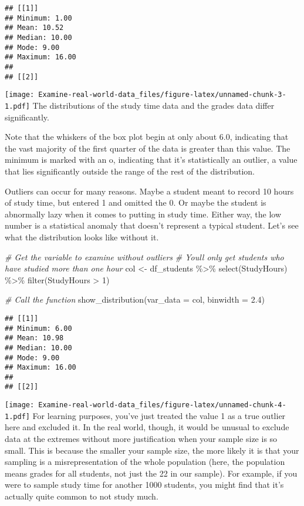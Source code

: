 \documentclass[
]{article}
\newenvironment{Shaded}{\begin{snugshade}}{\end{snugshade}}
\newcommand{\AttributeTok}[1]{\textcolor[rgb]{0.77,0.63,0.00}{#1}}
\newcommand{\CommentTok}[1]{\textcolor[rgb]{0.56,0.35,0.01}{\textit{#1}}}
\newcommand{\DecValTok}[1]{\textcolor[rgb]{0.00,0.00,0.81}{#1}}
\newcommand{\FloatTok}[1]{\textcolor[rgb]{0.00,0.00,0.81}{#1}}
\newcommand{\FunctionTok}[1]{\textcolor[rgb]{0.00,0.00,0.00}{#1}}
\newcommand{\NormalTok}[1]{#1}
\newcommand{\OtherTok}[1]{\textcolor[rgb]{0.56,0.35,0.01}{#1}}
\newcommand{\SpecialCharTok}[1]{\textcolor[rgb]{0.00,0.00,0.00}{#1}}
\begin{document}
\begin{verbatim}
## [[1]]
## Minimum: 1.00
## Mean: 10.52
## Median: 10.00
## Mode: 9.00
## Maximum: 16.00
## 
## [[2]]
\end{verbatim}

\texttt{[image: Examine-real-world-data\_files/figure-latex/unnamed-chunk-3-1.pdf]}
The distributions of the study time data and the grades data differ
significantly.

Note that the whiskers of the box plot begin at only about 6.0,
indicating that the vast majority of the first quarter of the data is
greater than this value. The minimum is marked with an o, indicating
that it's statistically an outlier, a value that lies significantly
outside the range of the rest of the distribution.

Outliers can occur for many reasons. Maybe a student meant to record 10
hours of study time, but entered 1 and omitted the 0. Or maybe the
student is abnormally lazy when it comes to putting in study time.
Either way, the low number is a statistical anomaly that doesn't
represent a typical student. Let's see what the distribution looks like
without it.

\begin{Shaded}
\begin{Highlighting}[]
\CommentTok{\# Get the variable to examine without outliers}
\CommentTok{\# You\textquotesingle{}ll only get students who have studied more than one hour}
\NormalTok{col }\OtherTok{\textless{}{-}}\NormalTok{ df\_students }\SpecialCharTok{\%\textgreater{}\%} 
  \FunctionTok{select}\NormalTok{(StudyHours) }\SpecialCharTok{\%\textgreater{}\%} 
  \FunctionTok{filter}\NormalTok{(StudyHours }\SpecialCharTok{\textgreater{}} \DecValTok{1}\NormalTok{)}


\CommentTok{\# Call the function}
\FunctionTok{show\_distribution}\NormalTok{(}\AttributeTok{var\_data =}\NormalTok{ col, }\AttributeTok{binwidth =} \FloatTok{2.4}\NormalTok{)}
\end{Highlighting}
\end{Shaded}

\begin{verbatim}
## [[1]]
## Minimum: 6.00
## Mean: 10.98
## Median: 10.00
## Mode: 9.00
## Maximum: 16.00
## 
## [[2]]
\end{verbatim}

\texttt{[image: Examine-real-world-data\_files/figure-latex/unnamed-chunk-4-1.pdf]}
For learning purposes, you've just treated the value 1 as a true outlier
here and excluded it. In the real world, though, it would be unusual to
exclude data at the extremes without more justification when your sample
size is so small. This is because the smaller your sample size, the more
likely it is that your sampling is a misrepresentation of the whole
population (here, the population means grades for all students, not just
the 22 in our sample). For example, if you were to sample study time for
another 1000 students, you might find that it's actually quite common to
not study much.
\end{document}
